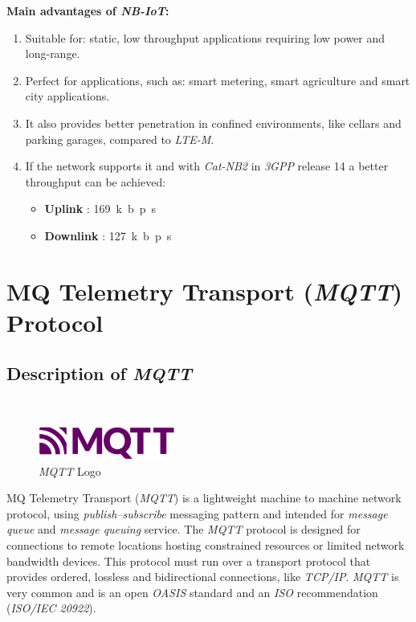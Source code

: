 \documentclass[report.tex]{subfiles}
\begin{document}
\begin{flushleft}
\textbf{Main advantages of \textit{NB-IoT}:}
\end{flushleft}
\begin{enumerate}
\item Suitable for: static, low throughput applications requiring low power and long-range.
\item Perfect for applications, such as: smart metering, smart agriculture and smart city applications. 
\item It also provides better penetration in confined environments, like cellars and parking garages, compared to \textit{LTE-M}.
\item If the network supports it and with \textit{Cat-NB2} in \textit{3GPP} release 14 a better throughput can be achieved:
\begin{itemize}
\item \textbf{Uplink} : \SI{169}{k b p s}
\item \textbf{Downlink} : \SI{127}{k b p s} 
\end{itemize}
\end{enumerate}

\section{MQ Telemetry Transport (\textit{MQTT}) Protocol}

\subsection{Description of \textit{MQTT}}
\;\\[-35pt]
\begin{figure}[H]
\centering
	\includegraphics[width=0.4\textwidth]{Include/Figure/research/mqtt_logo.png}
	\caption{\textit{MQTT} Logo\cite{MQTT}}
\label{fig:nbiotlogo}
\end{figure}

MQ Telemetry Transport (\textit{MQTT}\cite{MQTT}) is a lightweight machine to machine network protocol, using \textit{publish–subscribe} messaging pattern and intended for \textit{message queue} and \textit{message queuing} service. The \textit{MQTT} protocol is designed for connections to remote locations hosting constrained resources or limited network bandwidth devices. This protocol must run over a transport protocol that provides ordered, lossless and bidirectional connections, like \textit{TCP/IP}. \textit{MQTT} is very common and is an open \textit{OASIS} standard and an \textit{ISO} recommendation (\textit{ISO/IEC 20922}).
\end{document}
